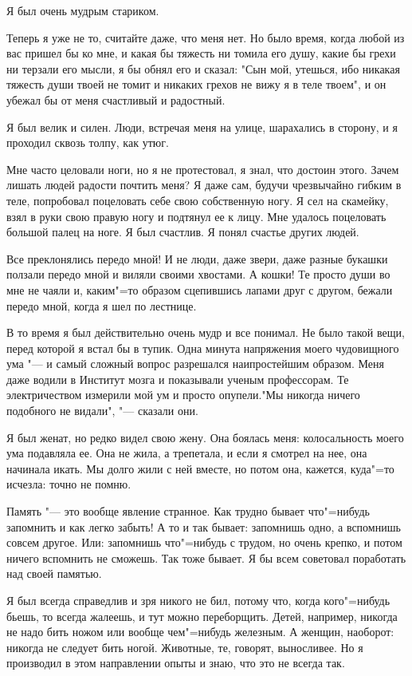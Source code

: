 Я был очень мудрым стариком.

Теперь я уже не то, считайте даже, что меня нет. Но было время, когда любой из вас пришел бы ко мне, и какая бы тяжесть ни томила его душу, какие бы грехи ни терзали его мысли, я бы обнял его и сказал: "Сын мой, утешься, ибо никакая тяжесть души твоей не томит и никаких грехов не вижу я в теле твоем", и он убежал бы от меня счастливый и радостный.

Я был велик и силен. Люди, встречая меня на улице, шарахались в сторону, и я проходил сквозь толпу, как утюг.

Мне часто целовали ноги, но я не протестовал, я знал, что достоин этого. Зачем лишать людей радости почтить меня? Я даже сам, будучи чрезвычайно гибким в теле, попробовал поцеловать себе свою собственную ногу. Я сел на скамейку, взял в руки  свою правую ногу и подтянул ее к лицу. Мне удалось поцеловать большой палец на ноге. Я был счастлив. Я понял счастье других людей.

Все  преклонялись передо мной! И не люди, даже звери, даже разные букашки ползали передо мной и виляли своими хвостами. А кошки! Те просто души во мне не чаяли и, каким"=то образом сцепившись лапами друг с другом, бежали передо мной, когда я шел по лестнице.

В то время я был действительно очень мудр и все понимал. Не было такой вещи, перед которой я встал бы в тупик. Одна минута напряжения моего чудовищного ума "--- и самый сложный вопрос разрешался наипростейшим образом. Меня даже водили в Институт мозга  и показывали  ученым  профессорам. Те электричеством измерили мой ум и просто опупели."Мы никогда ничего подобного не видали", "--- сказали они.

Я был женат, но редко видел свою жену. Она боялась меня: колосальность  моего ума подавляла ее. Она не жила, а трепетала, и если я смотрел на нее, она начинала икать. Мы долго жили с ней вместе, но потом она, кажется, куда"=то исчезла: точно не помню.

Память "---  это вообще  явление странное. Как трудно бывает что"=нибудь  запомнить и как легко забыть! А то и так бывает: запомнишь одно, а вспомнишь совсем  другое. Или: запомнишь что"=нибудь с трудом, но очень крепко, и потом ничего вспомнить не сможешь. Так тоже бывает. Я бы всем  советовал поработать над своей памятью.

Я был всегда справедлив и зря никого не бил, потому что, когда  кого"=нибудь бьешь, то всегда жалеешь, и тут можно переборщить. Детей, например, никогда не надо бить ножом или вообще чем"=нибудь железным. А женщин, наоборот: никогда не следует бить ногой. Животные, те, говорят,  выносливее. Но я производил в этом направлении опыты и знаю, что это не всегда так.

